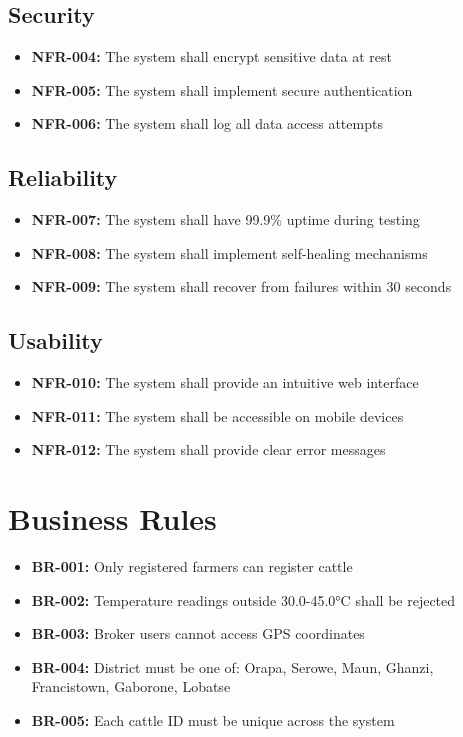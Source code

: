 \subsection{Security}

\begin{itemize}
    \item \textbf{NFR-004:} The system shall encrypt sensitive data at rest
    \item \textbf{NFR-005:} The system shall implement secure authentication
    \item \textbf{NFR-006:} The system shall log all data access attempts
\end{itemize}

\subsection{Reliability}

\begin{itemize}
    \item \textbf{NFR-007:} The system shall have 99.9\% uptime during testing
    \item \textbf{NFR-008:} The system shall implement self-healing mechanisms
    \item \textbf{NFR-009:} The system shall recover from failures within 30 seconds
\end{itemize}

\subsection{Usability}

\begin{itemize}
    \item \textbf{NFR-010:} The system shall provide an intuitive web interface
    \item \textbf{NFR-011:} The system shall be accessible on mobile devices
    \item \textbf{NFR-012:} The system shall provide clear error messages
\end{itemize}

\section{Business Rules}

\begin{itemize}
    \item \textbf{BR-001:} Only registered farmers can register cattle
    \item \textbf{BR-002:} Temperature readings outside 30.0-45.0°C shall be rejected
    \item \textbf{BR-003:} Broker users cannot access GPS coordinates
    \item \textbf{BR-004:} District must be one of: Orapa, Serowe, Maun, Ghanzi, Francistown, Gaborone, Lobatse
    \item \textbf{BR-005:} Each cattle ID must be unique across the system
\end{itemize}

